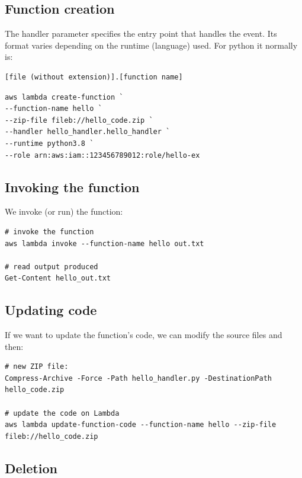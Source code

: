 \documentclass[slides]{pgnotes}
\begin{document}
\subsection{Function creation}\label{function-creation}

The handler parameter specifies the entry point that handles the event.
Its format varies depending on the runtime (language) used. For python
it normally is:

\begin{verbatim}
[file (without extension)].[function name]
\end{verbatim}

\begin{verbatim}
aws lambda create-function `
--function-name hello `
--zip-file fileb://hello_code.zip `
--handler hello_handler.hello_handler `
--runtime python3.8 `
--role arn:aws:iam::123456789012:role/hello-ex 
\end{verbatim}

\subsection{Invoking the function}\label{invoking-the-function}

We invoke (or run) the function:

\begin{verbatim}
# invoke the function
aws lambda invoke --function-name hello out.txt

# read output produced
Get-Content hello_out.txt 
\end{verbatim}

\subsection{Updating code}\label{updating-code}

If we want to update the function's code, we can modify the source files
and then:

\begin{verbatim}
# new ZIP file:
Compress-Archive -Force -Path hello_handler.py -DestinationPath hello_code.zip

# update the code on Lambda
aws lambda update-function-code --function-name hello --zip-file fileb://hello_code.zip 
\end{verbatim}

\subsection{Deletion}\label{deletion}
\end{document}
